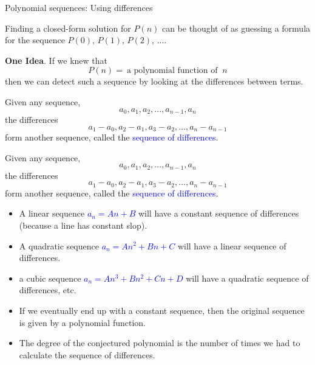 \documentclass[aspectratio=169]{beamer}
\providecommand{\Blue}[1]{\textcolor{blue}{#1}}
\begin{document}
\begin{frame}[plain]{Polynomial sequences: Using differences}

 Finding a closed-form solution for $P(n)$ can be thought of as guessing a formula
    for the sequence $P(0)$, $P(1)$, $P(2)$, ....  \pause
    \medskip
    
 {\bf One Idea}.  If we knew that  
     \[ P(n) = \ \mbox{a polynomial function of }\ n
      \]
     then we can detect such a sequence by looking at the differences 
     between terms.
\pause

 Given any sequence,
     \[ a_0, a_1, a_2, ..., a_{n-1}, a_n \]
  the differences 
   \[ a_1-a_0, a_2-a_1, a_3-a_2, ..., a_n-a_{n-1} \]
   form another sequence, called the \Blue{sequence of differences}.
 

\end{frame}

\begin{frame}[plain]{}

  Given any sequence,
  \[ a_0, a_1, a_2, ..., a_{n-1}, a_n \]
  the differences 
  \[ a_1-a_0, a_2-a_1, a_3-a_2, ..., a_n-a_{n-1} \]
  form another sequence, called the \Blue{sequence of differences}.

 \begin{itemize}
  \item A linear sequence \Blue{$a_n = An+B$} will have a constant sequence of differences (because a line has constant slop).
      \item A quadratic sequence \Blue{$a_n = An^2+Bn+C$} will have a linear sequence of differences.
      \item a cubic sequence \Blue{$a_n = An^3+Bn^2+Cn+D$}  will have a quadratic sequence of differences, etc.
      \item If we eventually end up with a constant sequence, then the original sequence
    is given by a polynomial function. 
      \item The degree of the conjectured polynomial
       is the number of times we had to calculate the 
    sequence of differences.
 \end{itemize}

\end{frame}
\end{document}
